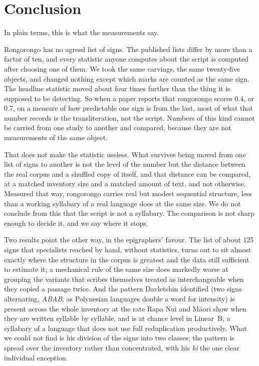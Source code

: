 \documentclass[11pt,a4paper]{article}
\begin{document}
\section{Conclusion}
\label{sec:conclusion}

In plain terms, this is what the measurements say.

Rongorongo has no agreed list of signs. The published lists differ by more than a factor of ten, and every statistic anyone computes about the script is computed after choosing one of them. We took the same carvings, the same twenty-five objects, and changed nothing except which marks are counted as the same sign. The headline statistic moved about four times further than the thing it is supposed to be detecting. So when a paper reports that rongorongo scores 0.4, or 0.7, on a measure of how predictable one sign is from the last, most of what that number records is the transliteration, not the script. Numbers of this kind cannot be carried from one study to another and compared, because they are not measurements of the same object.

That does not make the statistic useless. What survives being moved from one list of signs to another is not the level of the number but the distance between the real corpus and a shuffled copy of itself, and that distance can be compared, at a matched inventory size and a matched amount of text, and not otherwise. Measured that way, rongorongo carries real but modest sequential structure, less than a working syllabary of a real language does at the same size. We do not conclude from this that the script is not a syllabary. The comparison is not sharp enough to decide it, and we say where it stops.

Two results point the other way, in the epigraphers' favour. The list of about 125 signs that specialists reached by hand, without statistics, turns out to sit almost exactly where the structure in the corpus is greatest and the data still sufficient to estimate it; a mechanical rule of the same size does markedly worse at grouping the variants that scribes themselves treated as interchangeable when they copied a passage twice. And the pattern Davletshin identified (two signs alternating, \emph{ABAB}, as Polynesian languages double a word for intensity) is present across the whole inventory at the rate Rapa Nui and M\=aori show when they are written syllable by syllable, and is at chance level in Linear~B, a syllabary of a language that does not use full reduplication productively. What we could not find is his division of the signs into two classes; the pattern is spread over the inventory rather than concentrated, with his \emph{ki} the one clear individual exception.
\end{document}
